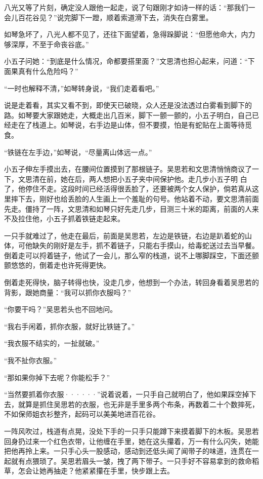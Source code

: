 八光又等了片刻，确定没人跟他一起走，说了句跟刚才如诗一样的话：“那我们一会儿百花谷见？”说完脚下一蹬，顺着索道滑下去，消失在白雾里。

如琴急坏了，八光人都不见了，还往下面望着，急得跺脚说：“但愿他命大，内力够深厚，不至于命丧谷底。”

小五子问她：“到底是什么情况，命都要搭里面？”文思清也担心起来，问道：“下面果真有什么危险吗？”

“一时也解释不清，”如琴转身说，“我们走着看吧。”

说是走着看，其实又看不到，即使天已破晓，众人还是没法透过白雾看到脚下的路。如琴要大家跟她走，大概走出几百米，脚下一颤一颤的，小五子明白，自己已经走在了栈道上。如琴说，右手边是山体，但不要摸，怕是有蛇贴在上面等待觅食。

“铁链在左手边，”如琴说，“尽量离山体远一点。”

小五子伸左手摸出去，在腰间位置摸到了那根链子。吴思若和文思清悄悄商议了一下，文思清在前，她在后，两人想把小五子夹中间保护他。走几步小五子明
白了，他停住不走。这段时间已经活得很丢脸了，还要被两个女人保护，倘若真从这里摔下去，刚好也给丢脸的人生画上一个羞耻的句号。他站着不动，要文思清前面先走。僵持了一阵，文思清和如琴只好先走几步，目测三十米的距离，前面的人来不及拉住他，小五子抓着铁链走起来。

一只手就难过了，他走在最后，前面是吴思若，左边是铁链，右边是趴着蛇的山体，可他缺失的刚好是左手，抓不着链子，只能右手摸山，给毒蛇送过去当早餐。倒着走可以捋着链子，他试了一会儿，那么窄的栈道，说不上哪脚踩空，下面还颤颤悠悠的，倒着走也许死得更快。

倒着走死得快，脑子转得也快，没走几步，他想到一个办法，转回身看着吴思若的背影，跟她商量：“我可以抓你衣服吗？”

“你要干吗？”吴思若头也不回地问。

“我右手闲着，抓你衣服，就好比铁链了。”

“我衣服不结实的，一扯就破。”

“我不扯你衣服。”

“那如果你掉下去呢？你能松手？”

“当然要抓着你衣服······”说着说着，一只手自己就明白了，他如果踩空掉下去，就算是抓住吴思若的衣服，也无非是手里多两个布条，再数着二十个数摔死，不如保师姐衣衫整齐，起码可以美美地进百花谷。

一阵风吹过，栈道有点晃，没处下手的一只手只能蹲下来摸着脚下的木板。吴思若回身扔过来一个红色衣带，让他缠在手里，她在这头攥着，万一有什么闪失，她能把他再拎上来。一只手心头一股感动，感动到还低头闻了闻带子的味道，连贯在一起就有点猥琐了。吴思若眉头一皱，拽了两下带子。一只手好不容易拿到的救命稻草，怎会让她再抽走？他紧紧攥在手里，快步跟上去。

